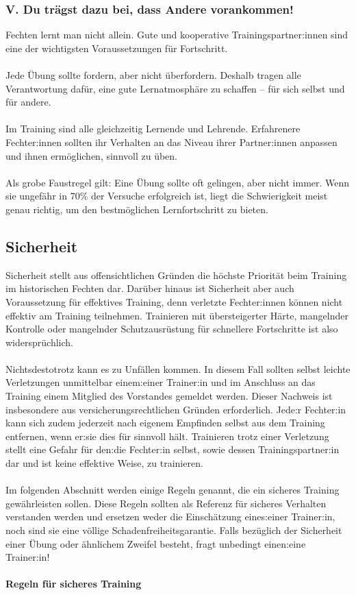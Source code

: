 \subsubsection*{V.  Du trägst dazu bei, dass Andere vorankommen!}

Fechten lernt man nicht allein. Gute und kooperative Trainingspartner:innen sind eine der wichtigsten Voraussetzungen für Fortschritt.
\\
\\
Jede Übung sollte fordern, aber nicht überfordern. Deshalb tragen alle Verantwortung dafür, eine gute Lernatmosphäre zu schaffen – für sich selbst und für andere.
\\
\\
Im Training sind alle gleichzeitig Lernende und Lehrende. Erfahrenere Fechter:innen sollten ihr Verhalten an das Niveau ihrer Partner:innen anpassen und ihnen ermöglichen, sinnvoll zu üben.
\\
\\
Als grobe Faustregel gilt: Eine Übung sollte oft gelingen, aber nicht immer. Wenn sie ungefähr in 70\% der Versuche erfolgreich ist, liegt die Schwierigkeit meist genau richtig, um den bestmöglichen Lernfortschritt zu bieten.

\newpage

\subsection{Sicherheit}

Sicherheit stellt aus offensichtlichen Gründen die höchste Priorität beim Training im historischen Fechten dar. Darüber hinaus ist Sicherheit aber auch Voraussetzung für effektives Training, denn verletzte Fechter:innen können nicht effektiv am Training teilnehmen. Trainieren mit übersteigerter Härte, mangelnder Kontrolle oder mangelnder Schutzausrüstung für schnellere Fortschritte ist also widersprüchlich.
\\
\\
Nichtsdestotrotz kann es zu Unfällen kommen. In diesem Fall sollten selbst leichte Verletzungen unmittelbar einem:einer Trainer:in und im Anschluss an das Training einem Mitglied des Vorstandes gemeldet werden. Dieser Nachweis ist insbesondere aus versicherungsrechtlichen Gründen erforderlich. Jede:r Fechter:in kann sich zudem jederzeit nach eigenem Empfinden selbst aus dem Training entfernen, wenn er:sie dies für sinnvoll hält. Trainieren trotz einer Verletzung stellt eine Gefahr für den:die Fechter:in selbst, sowie dessen Trainingspartner:in dar und ist keine effektive Weise, zu trainieren.
\\
\\
Im folgenden Abschnitt werden einige Regeln genannt, die ein sicheres Training gewährleisten sollen. Diese Regeln sollten als Referenz für sicheres Verhalten verstanden werden und ersetzen weder die Einschätzung eines:einer Trainer:in, noch sind sie eine völlige Schadenfreiheitsgarantie. Falls bezüglich der Sicherheit einer Übung oder ähnlichem Zweifel besteht, fragt unbedingt einen:eine Trainer:in!
\\
\\
\textbf{Regeln für sicheres Training}

